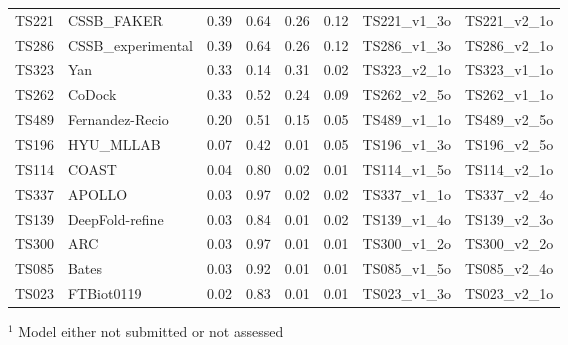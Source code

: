 \begin{table}[ht]
{\begin{tabular}{llllllll}
TS221 & CSSB\_FAKER & 0.39 & 0.64 & 0.26 & 0.12 & TS221\_v1\_3o & TS221\_v2\_1o \\ 
TS286 & CSSB\_experimental & 0.39 & 0.64 & 0.26 & 0.12 & TS286\_v1\_3o & TS286\_v2\_1o \\ 
TS323 & Yan & 0.33 & 0.14 & 0.31 & 0.02 & TS323\_v2\_1o & TS323\_v1\_1o \\ 
TS262 & CoDock & 0.33 & 0.52 & 0.24 & 0.09 & TS262\_v2\_5o & TS262\_v1\_1o \\ 
TS489 & Fernandez-Recio & 0.20 & 0.51 & 0.15 & 0.05 & TS489\_v1\_1o & TS489\_v2\_5o \\ 
TS196 & HYU\_MLLAB & 0.07 & 0.42 & 0.01 & 0.05 & TS196\_v1\_3o & TS196\_v2\_5o \\ 
TS114 & COAST & 0.04 & 0.80 & 0.02 & 0.01 & TS114\_v1\_5o & TS114\_v2\_1o \\ 
TS337 & APOLLO & 0.03 & 0.97 & 0.02 & 0.02 & TS337\_v1\_1o & TS337\_v2\_4o \\ 
TS139 & DeepFold-refine & 0.03 & 0.84 & 0.01 & 0.02 & TS139\_v1\_4o & TS139\_v2\_3o \\ 
TS300 & ARC & 0.03 & 0.97 & 0.01 & 0.01 & TS300\_v1\_2o & TS300\_v2\_2o \\ 
TS085 & Bates & 0.03 & 0.92 & 0.01 & 0.01 & TS085\_v1\_5o & TS085\_v2\_4o \\ 
TS023 & FTBiot0119 & 0.02 & 0.83 & 0.01 & 0.01 & TS023\_v1\_3o & TS023\_v2\_1o \\ 
\bottomrule
\end{tabular}%
}
\begin{flushleft}\footnotesize $^{1}$ Model either not submitted or not assessed\end{flushleft}
\end{table}
